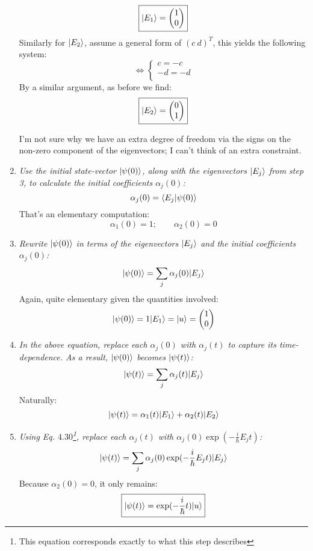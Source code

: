 \documentclass[solutions.tex]{subfiles}
\begin{document}
\begin{enumerate}
\[		\boxed{|E_1\rangle = \begin{pmatrix} 1 \\ 0 \\ \end{pmatrix}}
	\]
	Similarly for $|E_2\rangle$, assume a general form of $(c\ d)^T$,
	this yields the following system:
	\[
		\Leftrightarrow \begin{cases}
			c = -c \\
			-d = -d \\
		\end{cases}
	\]
	By a similar argument, as before we find:
	\[
		\boxed{|E_2\rangle = \begin{pmatrix} 0 \\ 1 \\ \end{pmatrix}}
	\]
	\begin{remark} I'm not sure why we have an extra degree
	of freedom via the signs on the non-zero component
	of the eigenvectors; I can't think of an extra constraint.
	\end{remark}
	\item \textit{Use the initial state-vector $|\psi(0)\rangle$, along with
	the eigenvectors $|E_j\rangle$ from step 3, to calculate the initial
	coefficients $\alpha_j(0)$:
	\[
		\alpha_j(0) = \left\langle E_j \middle| \psi(0) \right\rangle
	\]}
	That's an elementary computation:
	\[
		\alpha_1(0) = 1;\qquad \alpha_2(0) = 0
	\]
	\item \textit{Rewrite $|\psi(0)\rangle$ in terms of the eigenvectors
	$|E_j\rangle$ and the initial coefficients $\alpha_j(0)$:
	\[
		|\psi(0)\rangle = \sum_j\alpha_j(0)|E_j\rangle
	\]}
	Again, quite elementary given the quantities involved:
	\[
		|\psi(0)\rangle = 1|E_1\rangle = |u\rangle
			= \begin{pmatrix} 1 \\ 0 \\ \end{pmatrix}
	\]
	\item \textit{In the above equation, replace each $\alpha_j(0)$ with
	$\alpha_j(t)$ to capture its time-dependence. As a result, $|\psi(0)\rangle$
	becomes $|\psi(t)\rangle$:
	\[
		|\psi(t)\rangle = \sum_j\alpha_j(t)|E_j\rangle
	\]}
	Naturally:
	\[
		|\psi(t)\rangle = \alpha_1(t)|E_1\rangle+\alpha_2(t)|E_2\rangle
	\]
	\item \textit{Using Eq. $4.30$\footnote{This equation corresponds
	exactly to what this step describes}, replace each $\alpha_j(t)$ with
	$\alpha_j(0)\exp(-\frac{i}\hbar E_jt)$:
	\[
		|\psi(t)\rangle = \sum_j\alpha_j(0)\exp(-\frac{i}\hbar E_jt)|E_j\rangle
	\]}
	Because $\alpha_2(0) = 0$, it only remains:
	\[
		\boxed{|\psi(t)\rangle = \exp(-\frac{i}\hbar t)|u\rangle}
	\]
\end{enumerate}
\end{document}
